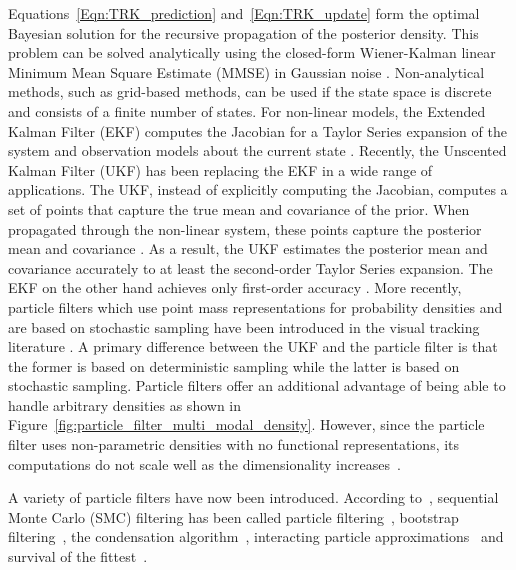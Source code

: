 \begin{Body}
Equations~\ref{Eqn:TRK_prediction} and~\ref{Eqn:TRK_update} form the optimal Bayesian solution for the recursive propagation of the posterior density.  This problem can be solved analytically using the closed-form Wiener-Kalman linear Minimum Mean Square Estimate (MMSE) in Gaussian noise \cite{1964_JNL_BayesianEstimation_Ho, 1993_BOOK_SSP_Kay}.  Non-analytical methods, such as grid-based methods, can be used if the state space is discrete and consists of a finite number of states.  For non-linear models, the Extended Kalman Filter (EKF) computes the Jacobian for a Taylor Series expansion of the system and observation models about the current state \cite{2005_Misc_KalmanFilterComparison_Orderud}.  Recently, the Unscented Kalman Filter (UKF) has been replacing the EKF in a wide range of applications.  The UKF, instead of explicitly computing the Jacobian, computes a set of points that capture the true mean and covariance of the prior.  When propagated through the non-linear system, these points capture the posterior mean and covariance \cite{1997_CNF_UKF_Julier}.  As a result, the UKF estimates the posterior mean and covariance accurately to at least the second-order Taylor Series expansion.  The EKF on the other hand achieves only first-order accuracy \cite{2004_CNF_SigmaPointKalman_Merwe, 2000_CNF_UKF_Wan}.  More recently, particle filters which use point mass representations for probability densities and are based on stochastic sampling have been introduced in the visual tracking literature \cite{1993_JNL_ParticleFilter_Gordon, 2001_JNL_PFjumpMarkov_Doucet}.  A primary difference between the UKF and the particle filter is that the former is based on deterministic sampling while the latter is based on stochastic sampling.  Particle filters offer an additional advantage of being able to handle arbitrary densities as shown in Figure~\ref{fig:particle_filter_multi_modal_density}.  However, since the particle filter uses non-parametric densities with no functional representations, its computations do not scale well as the dimensionality increases~\cite{2004_CNF_TrackingPeople_Zhao}.  

A variety of particle filters have now been introduced.   According to~\cite{2002_JNL_PF_Arulampalam}, sequential Monte Carlo (SMC) filtering has been called particle filtering~\cite{1999_CNF_PF_carpenter}, bootstrap filtering~\cite{1993_JNL_ParticleFilter_Gordon}, the condensation algorithm~\cite{1998_JNL_Condensation_IsardBlake}, interacting particle approximations~\cite{1999_JNL_PF_Crisan, 1999_BK_PF_Moral} and survival of the fittest~\cite{1995_CNF_PF_Kanazawa}.


\end{Body}
